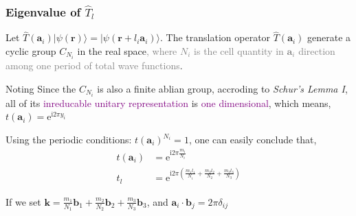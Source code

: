 \documentclass{beamer}
\begin{document}
  \begin{frame}
  \frametitle{Eigenvalue of \(\widehat{T}_l\)}
  
  Let \(\widehat{T}(\mathbf{a}_i) |\psi(\mathbf{r})\rangle = |\psi(\mathbf{r}+l_i\mathbf{a}_i)\rangle\). The translation operator \(\widehat{T}(\mathbf{a}_i)\) generate a cyclic group \(C_{N_i}\) in the real space\textcolor{gray}{, where \(N_i\) is the cell quantity in \(\mathbf{a}_i\) direction among one period of total wave functions}.

  \begin{block}{Noting}
    Since the \(C_{N_i}\) is also a finite ablian group, accroding to \emph{Schur's Lemma I}, all of its \textcolor{purple}{inreducable unitary representation} is \textcolor{purple}{one dimensional}, which means, \(t(\mathbf{a}_i) = \mathrm{e}^{\mathrm{i}2\pi{}y_i}\)
  \end{block}

  Using the periodic conditions: \(t(\mathbf{a}_i)^{N_i}=1\), one can easily conclude that, 
  \begin{subequations}
    \begin{align}
      t(\mathbf{a}_i) &= \mathrm{e}^{\mathrm{i}2\pi{}\frac{m_i}{N_i}}\\
      t_l &= \mathrm{e}^{\mathrm{i}2\pi{}\left(\frac{m_1l_1}{N_i}+\frac{m_2l_2}{N_2}+\frac{m_3l_3}{N_3}\right)}
    \end{align}
  \end{subequations}

  If we set \(\mathbf{k} = \frac{m_1}{N_1}\mathbf{b}_1+\frac{m_2}{N_2}\mathbf{b}_2+\frac{m_3}{N_3}\mathbf{b}_3\), and \(\mathbf{a}_i\cdot\mathbf{b}_j = 2\pi\delta_{ij}\)

  \end{frame}
\end{document}
